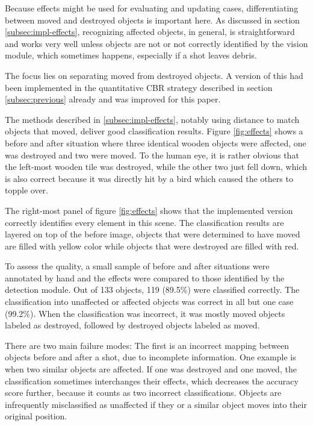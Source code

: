 Because effects might be used for evaluating and updating cases, differentiating between moved and destroyed objects is important here.
As discussed in section \ref{subsec:impl-effects}, recognizing affected objects, in general, is straightforward and works very well unless objects are not or not correctly identified by the vision module, which sometimes happens, especially if a shot leaves debris.

The focus lies on separating moved from destroyed objects.
A version of this had been implemented in the quantitative \ac{CBR} strategy described in section \ref{subsec:previous} already and was improved for this paper.

The methods described in \ref{subsec:impl-effects}, notably using distance to match objects that moved, deliver good classification results. Figure \ref{fig:effects} shows a before and after situation where three identical wooden objects were affected, one was destroyed and two were moved.
To the human eye, it is rather obvious that the left-most wooden tile was destroyed, while the other two just fell down, which is also correct because it was directly hit by a bird which caused the others to topple over.

The right-most panel of figure \ref{fig:effects} shows that the implemented version correctly identifies every element in this scene.
The classification results are layered on top of the before image, objects that were determined to have moved are filled with yellow color while objects that were destroyed are filled with red.


To assess the quality, a small sample of before and after situations were annotated by hand and the effects were compared to those identified by the detection module. Out of 133 objects, 119 (89.5\%) were classified correctly. The classification into unaffected or affected objects was correct in all but one case (99.2\%).
When the classification was incorrect, it was mostly moved objects labeled as destroyed, followed by destroyed objects labeled as moved.

There are two main failure modes: The first is an incorrect mapping between objects before and after a shot, due to incomplete information. One example is when two similar objects are affected. If one was destroyed and one moved, the classification sometimes interchanges their effects, which decreases the accuracy score further, because it counts as two incorrect classifications.
Objects are infrequently misclassified as unaffected if they or a similar object moves into their original position.

